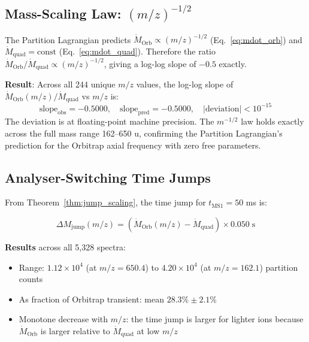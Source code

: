 \subsection{Mass-Scaling Law: $(m/z)^{-1/2}$}
\label{subsec:scaling_law}

The Partition Lagrangian predicts $\dot{M}_{\mathrm{Orb}} \propto (m/z)^{-1/2}$
(Eq.~\eqref{eq:mdot_orb}) and $\dot{M}_{\mathrm{quad}} = \mathrm{const}$
(Eq.~\eqref{eq:mdot_quad}). Therefore the ratio $\dot{M}_{\mathrm{Orb}}/
\dot{M}_{\mathrm{quad}} \propto (m/z)^{-1/2}$, giving a log-log slope of
$-0.5$ exactly.

\textbf{Result}: Across all 244 unique $m/z$ values, the log-log slope of
$\dot{M}_{\mathrm{Orb}}(m/z)/\dot{M}_{\mathrm{quad}}$ vs $m/z$ is:
\begin{equation}
    \mathrm{slope}_{\mathrm{obs}} = -0.5000, \quad
    \mathrm{slope}_{\mathrm{pred}} = -0.5000, \quad
    |\mathrm{deviation}| < 10^{-15}
    \label{eq:slope_result}
\end{equation}
The deviation is at floating-point machine precision. The $m^{-1/2}$ law holds
exactly across the full mass range 162--650 u, confirming the Partition
Lagrangian's prediction for the Orbitrap axial frequency with zero free
parameters.

\subsection{Analyser-Switching Time Jumps}
\label{subsec:jump_results}

From Theorem~\ref{thm:jump_scaling}, the time jump for $t_{\mathrm{MS1}} = 50$
ms is:

\begin{equation}
    \Delta M_{\mathrm{jump}}(m/z) = \left(\dot{M}_{\mathrm{Orb}}(m/z) -
    \dot{M}_{\mathrm{quad}}\right) \times 0.050 \;\mathrm{s}
    \label{eq:jump_result}
\end{equation}

\textbf{Results} across all 5,328 spectra:
\begin{itemize}
    \item Range: $1.12 \times 10^4$ (at $m/z = 650.4$) to $4.20 \times 10^4$
          (at $m/z = 162.1$) partition counts
    \item As fraction of Orbitrap transient: mean $28.3\% \pm 2.1\%$
    \item Monotone decrease with $m/z$: the time jump is larger for lighter ions
          because $\dot{M}_{\mathrm{Orb}}$ is larger relative to
          $\dot{M}_{\mathrm{quad}}$ at low $m/z$
\end{itemize}

